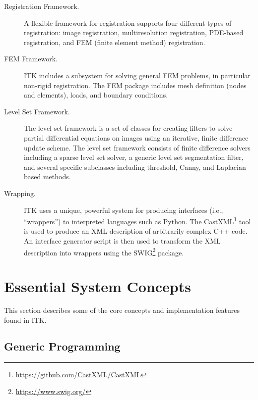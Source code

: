 \begin{description}
  \item[Registration Framework.] A flexible framework for registration
        supports four different types of registration: image registration,
        multiresolution registration, PDE-based registration, and FEM (finite
        element method) registration.

  \item[FEM Framework.] ITK includes a subsystem for solving general
        FEM problems, in particular non-rigid registration. The FEM package
        includes mesh definition (nodes and elements), loads, and boundary
        conditions.

  \item[Level Set Framework.] The level set framework is a set of
        classes for creating filters to solve partial differential equations
        on images using an iterative, finite difference update scheme. The
        level set framework consists of finite difference solvers including a
        sparse level set solver, a generic level set segmentation filter, and
        several specific subclasses including threshold, Canny, and Laplacian
        based methods.

  \item[Wrapping.] ITK uses a unique, powerful system for producing interfaces
        (i.e., ``wrappers'') to interpreted languages such as Python. The
        CastXML\footnote{\url{https://github.com/CastXML/CastXML}}
        tool is used to produce an XML description of arbitrarily complex C++
        code. An interface generator script is then used to transform the XML
        description into wrappers using the
        SWIG\footnote{\url{https://www.swig.org/}} package.

\end{description}


\section{Essential System Concepts}
\label{sec:EssentialSystemConcepts}

This section describes some of the core concepts and implementation features
found in ITK.

\subsection{Generic Programming}
\label{sec:GenericProgramming}


